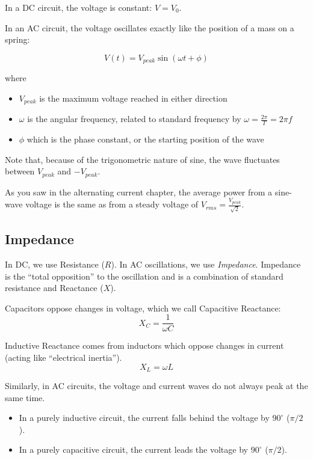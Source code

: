 In a DC circuit, the voltage is constant: $V = V_0$.

In an AC circuit, the voltage oscillates exactly like the position of a mass on a spring:

\begin{equation}
V(t) = V_{peak} \sin(\omega t + \phi)
\end{equation}

where
\begin{itemize}
	\item $V_{peak}$ is the maximum voltage reached in either direction
	\item $\omega$ is the angular frequency, related to standard frequency by $\omega ={\frac {2\pi }{T}}={2\pi f}$
	\item $\phi$ which is the phase constant, or the starting position of the wave
\end{itemize}
Note that, because of the trigonometric nature of sine, the wave fluctuates between $V_{peak}$ and $-V_{peak}$. 

As you saw in the alternating current chapter, the average power from a
sine-wave voltage is the same as from a steady voltage of
$V_{rms} = \frac{V_{peak}}{\sqrt{2}}$.
\subsection{Impedance}
In DC, we use Resistance ($R$). In AC oscillations, we use \textit{Impedance}. Impedance is the ``total opposition'' to the oscillation and is a combination of standard resistance and Reactance ($X$).

Capacitors oppose changes in voltage, which we call Capacitive Reactance:$$X_C = \frac{1}{\omega C}$$

Inductive Reactance comes from inductors which oppose changes in current (acting like ``electrical inertia'').$$X_L = \omega L$$

Similarly, in AC circuits, the voltage and current waves do not always peak at the same time. 
\begin{itemize}
	\item In a purely inductive circuit, the current falls behind the voltage by $90^\circ$ ($\pi/2$). 
	\item In a purely capacitive circuit, the current leads the voltage by $90^\circ$ ($\pi/2$).
\end{itemize}
